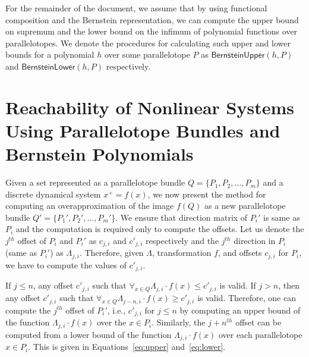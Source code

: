 \documentclass[EPiC]{easychair}
\begin{document}
For the remainder of the document, we assume that by using functional composition and the Bernstein representation, we can compute the upper bound on supremum and the lower bound on the infimum of polynomial functions over parallelotopes.
%
We denote the procedures for calculating such upper and lower bounds for a polynomial $h$ over some parallelotope $P$ as $\mathsf{BernsteinUpper}(h,P)$ and $\mathsf{BernsteinLower}(h,P)$ respectively. 

\section{Reachability of Nonlinear Systems Using Parallelotope Bundles and Bernstein Polynomials}

Given a set represented as a parallelotope bundle $Q = \{P_1, P_2, \ldots, P_m\}$ and a discrete dynamical system $x^{+} = f(x)$, we now present the method for computing an overapproximation of the image $f(Q)$ as a new parallelotope bundle $Q' = \{P_1', P_2', \ldots, P_m'\}$.
%
We ensure that direction matrix of $P_i'$ is same as $P_i$ and the computation is required only to compute the offsets. 
%
Let us denote the $j^{th}$ offset of $P_i$ and $P_i'$ as $c_{j,i}$ and $c'_{j,i}$ respectively and the $j^{th}$ direction in $P_i$ (same as $P_i'$) as $\Lambda_{j,i}$.
%
Therefore, given $\Lambda$, transformation $f$, and offsets $c_{j,i}$ for $P_i$, we have to compute the values of $c'_{j,i}$.

%
%
If $j \leq n$, any offset $c'_{j,i}$ such that $\forall_{x\in Q} \Lambda_{j,i} \cdot f(x) \leq c'_{j,i}$ is valid.
%
%
If $j > n$, then any offset $c'_{j,i}$ such that $\forall_{x \in Q} \Lambda_{j-n,i} \cdot f(x) \geq c'_{j,i}$ is valid.
%
Therefore, one can compute the $j^{th}$ offset of $P_i'$, i.e., $c'_{j,i}$ for $j \leq n$ by computing an upper bound of the function $\Lambda_{j,i} \cdot f(x)$ over the $x\in P_i$.
%
Similarly, the $j+n^{th}$ offset can be computed from a lower bound of the function $\Lambda_{j,i} \cdot f(x)$ over each parallelotope $x\in P_i$.
%
This is given in Equations~\ref{eq:upper} and~\ref{eq:lower}.
\end{document}
